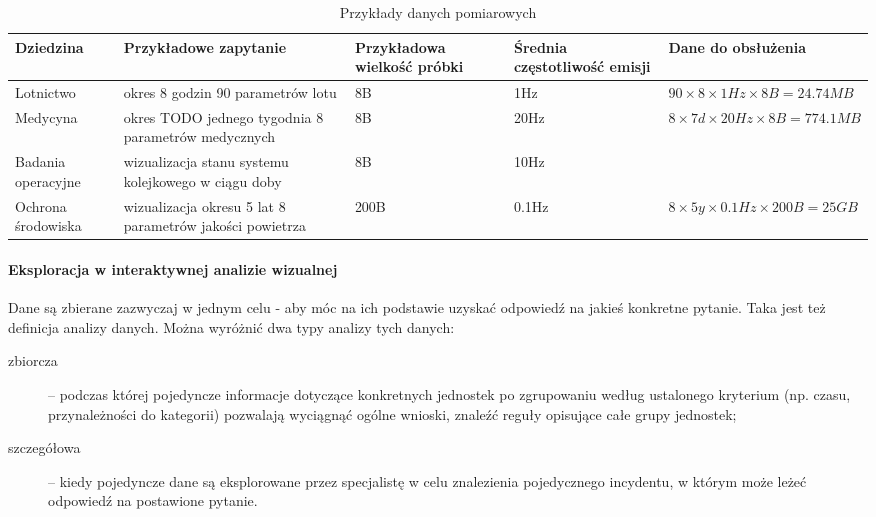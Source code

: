 \begin{table}[H]
	\begin{tabu} { |X[1,m] X X[2,r] X[2,r] X[3,r] |}
		\hline
			Dziedzina          
			& Przykładowe zapytanie                                             
			& Przykładowa wielkość próbki 
			& Średnia częstotliwość emisji
			& Dane do obsłużenia           
		\\
		\hline
		Lotnictwo          
		& okres 8 godzin 90 parametrów lotu              
		& 8B                          
		& 1Hz                          
		& $90 \times 8 \times 1Hz \times 8B = 24.74MB$
		\\
		\hline
		Medycyna           
		& okres TODO jednego tygodnia 8 parametrów medycznych 
		& 8B                          
		& 20Hz                         
		& $8 \times 7d \times 20Hz \times 8B = 774.1MB$
		\\
		\hline
		Badania operacyjne
		& wizualizacja stanu systemu kolejkowego w ciągu doby          
		& 8B                          
		& 10Hz                         
		& ~                            
		\\
		\hline
		Ochrona środowiska & wizualizacja okresu 5 lat 8 parametrów jakości powietrza     
		& 200B                        
		& 0.1Hz                        
		& $8 \times 5y \times 0.1Hz \times 200B = 25GB$
		\\
		\hline
	\end{tabu}
	\caption{Przykłady danych pomiarowych}
	\label{table:measurementDataExamples}
\end{table}


\paragraph{Eksploracja w interaktywnej analizie wizualnej}
Dane są zbierane zazwyczaj w jednym celu - aby móc na ich podstawie uzyskać odpowiedź na jakieś konkretne pytanie. Taka jest też definicja analizy danych.
Można wyróżnić dwa typy analizy tych danych:
\begin{description}
	\item[zbiorcza]-- podczas której pojedyncze informacje dotyczące konkretnych jednostek po zgrupowaniu według ustalonego kryterium (np. czasu, przynależności do kategorii) pozwalają wyciągnąć ogólne wnioski, znaleźć reguły opisujące całe grupy jednostek;
	
	\item[szczegółowa]-- kiedy pojedyncze dane są eksplorowane przez specjalistę w celu znalezienia pojedycznego incydentu, w którym może leżeć odpowiedź na postawione pytanie.
\end{description}

